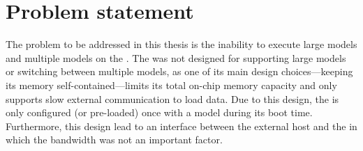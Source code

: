 \section{Problem statement}
The problem to be addressed in this thesis is the inability to execute large models and multiple models on the \graicore{}.
The \graicore{} was not designed for supporting large models or switching between multiple models, as one of its main design choices---keeping its memory self-contained---limits its total on-chip memory capacity and only supports slow external communication to load data.
Due to this design, the \graicore{} is only configured (or pre-loaded) once with a model during its boot time.
Furthermore, this design lead to an interface between the external host and the \graicore{} in which the bandwidth was not an important factor.




